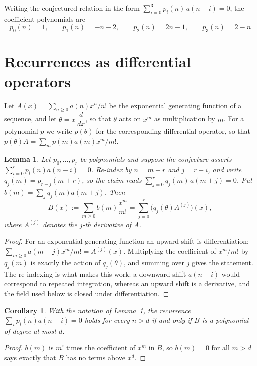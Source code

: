 \documentclass[11pt,a4paper]{article}
\theoremstyle{plain}
\newtheorem{lemma}[theorem]{Lemma}
\newtheorem{corollary}[theorem]{Corollary}
\theoremstyle{definition}
\begin{document}
Writing the conjectured relation in the form $\sum_{i=0}^{3}p_{i}(n)\,a(n-i)=0$,
the coefficient polynomials are
\[
p_{0}(n)=1,\qquad p_{1}(n)=- n - 2,\qquad p_{2}(n)=2 n - 1,\qquad p_{3}(n)=2 - n
\]

\section{Recurrences as differential operators}

Let $A(x)=\sum_{n\ge0}a(n)x^{n}/n!$ be the exponential generating function of a sequence, and let
$\theta=x\,\dfrac{d}{dx}$, so that $\theta$ acts on $x^{m}$ as multiplication by $m$. For a
polynomial $p$ we write $p(\theta)$ for the corresponding differential operator, so that
$p(\theta)A=\sum_{m}p(m)a(m)x^{m}/m!$.

\begin{lemma}\label{lem:transfer}
Let $p_{0},\dots,p_{r}$ be polynomials and suppose the conjecture asserts
$\sum_{i=0}^{r}p_{i}(n)a(n-i)=0$. Re-index by $n=m+r$ and $j=r-i$, and write
$q_{j}(m)=p_{r-j}(m+r)$, so the claim reads $\sum_{j=0}^{r}q_{j}(m)\,a(m+j)=0$. Put
$b(m)=\sum_{j}q_{j}(m)a(m+j)$. Then
\[
B(x):=\sum_{m\ge0}b(m)\frac{x^{m}}{m!}=\sum_{j=0}^{r}\bigl(q_{j}(\theta)A^{(j)}\bigr)(x),
\]
where $A^{(j)}$ denotes the $j$-th derivative of $A$.
\end{lemma}

\begin{proof}
For an exponential generating function an upward shift is differentiation:
$\sum_{m\ge0}a(m+j)x^{m}/m!=A^{(j)}(x)$. Multiplying the coefficient of $x^{m}/m!$ by
$q_{j}(m)$ is exactly the action of $q_{j}(\theta)$, and summing over $j$ gives the
statement. The re-indexing is what makes this work: a downward shift $a(n-i)$ would
correspond to repeated integration, whereas an upward shift is a derivative, and the
field used below is closed under differentiation.
\end{proof}

\begin{corollary}\label{cor:criterion}
With the notation of Lemma~\ref{lem:transfer}, the recurrence
$\sum_{i}p_{i}(n)a(n-i)=0$ holds for every $n>d$ if and only if $B$ is a polynomial of
degree at most $d$.
\end{corollary}

\begin{proof}
$b(m)$ is $m!$ times the coefficient of $x^{m}$ in $B$, so $b(m)=0$ for all $m>d$ says
exactly that $B$ has no terms above $x^{d}$.
\end{proof}
\end{document}
